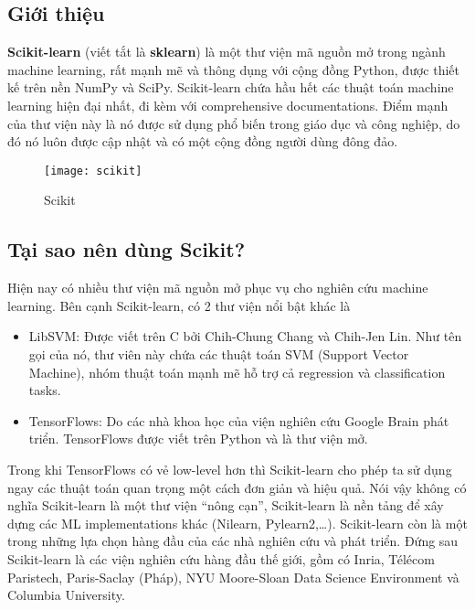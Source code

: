 \subsection{Giới thiệu}
\textbf{Scikit-learn} (viết tắt là \textbf{sklearn}) là một thư viện mã nguồn mở trong ngành machine learning, 
rất mạnh mẽ và thông dụng với cộng đồng Python, được thiết kế trên nền NumPy và SciPy. 
Scikit-learn chứa hầu hết các thuật toán machine learning hiện đại nhất, 
đi kèm với comprehensive documentations. Điểm mạnh của thư viện này là nó được sử dụng phổ biến trong giáo dục và công nghiệp, 
do đó nó luôn được cập nhật và có một cộng đồng người dùng đông đảo.
\begin{figure}[!htbp]
    \centering
    \texttt{[image: scikit]}
    \caption{Scikit}
    \label{fig:x cubed graph}
\end{figure}
\FloatBarrier
\subsection{Tại sao nên dùng Scikit?}
Hiện nay có nhiều thư viện mã nguồn mở phục vụ cho nghiên cứu machine learning. Bên cạnh Scikit-learn, có 2 thư viện nổi bật khác là
\begin{itemize}
    \item LibSVM: Được viết trên C bởi Chih-Chung Chang và Chih-Jen Lin. Như tên gọi của nó, thư viên này chứa các thuật toán SVM (Support Vector Machine), nhóm thuật toán mạnh mẽ hỗ trợ cả regression và classification tasks.
    \item TensorFlows: Do các nhà khoa học của viện nghiên cứu Google Brain phát triển. TensorFlows được viết trên Python và là thư viện mở.
\end{itemize}
Trong khi TensorFlows có vẻ low-level hơn thì Scikit-learn cho phép ta sử dụng ngay các thuật toán quan trọng một cách đơn giản và hiệu quả. 
Nói vậy không có nghĩa Scikit-learn là một thư viện “nông cạn”, Scikit-learn là nền tảng để xây dựng các ML implementations khác (Nilearn, Pylearn2,…). 
Scikit-learn còn là một trong những lựa chọn hàng đầu của các nhà nghiên cứu và phát triển. Đứng sau Scikit-learn là các viện nghiên cứu hàng đầu thế giới, gồm có Inria, Télécom Paristech, Paris-Saclay (Pháp), NYU Moore-Sloan Data Science Environment và Columbia University.